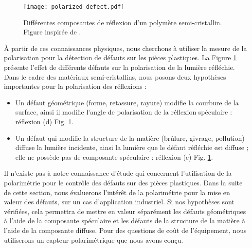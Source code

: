 \begin{figure}[tbhp]
	\centering
	\texttt{[image: polarized\_defect.pdf]}
	\caption{Différentes composantes de réflexion d'un polymère semi-cristallin. Figure inspirée de \cite{debevec_acquiring_2000}.}
	\label{fig:polarized_defect}
\end{figure}

À partir de ces connaissances physiques, nous cherchons à utiliser la mesure de la polarisation pour la détection de défauts sur les pièces plastiques.
La Figure \ref{fig:polarized_defect} présente l'effet de différents défauts sur la polarisation de la lumière réfléchie.
Dans le cadre des matériaux semi-cristallins, nous posons deux hypothèses importantes pour la polarisation des réflexions :
\begin{itemize}
	\item Un défaut géométrique (forme, retassure, rayure)  modifie la courbure de la surface, ainsi il modifie l'angle de polarisation de la réflexion spéculaire : réflexion (d) Fig. \ref{fig:polarized_defect}.
	\item Un défaut qui modifie la structure de la matière (brûlure, givrage, pollution) diffuse la lumière incidente, ainsi la lumière que le défaut réfléchie est diffuse ; elle ne possède pas de composante spéculaire : réflexion (c) Fig. \ref{fig:polarized_defect}.
\end{itemize}
Il n'existe pas à notre connaissance d'étude qui concernent l'utilisation de la polarimétrie pour le contrôle des défauts sur des pièces plastiques.
Dans la suite de cette section, nous évaluerons l'intérêt de la polarimétrie pour la mise en valeur des défauts, sur un cas d'application industriel.
Si nos hypothèses sont vérifiées, cela permettra de mettre en valeur séparément les défauts géométriques à l'aide de la composante spéculaire et les défauts de la structure de la matière à l'aide de la composante diffuse.
Pour des questions de coût de l'équipement, nous utiliserons un capteur polarimétrique que nous avons conçu.


